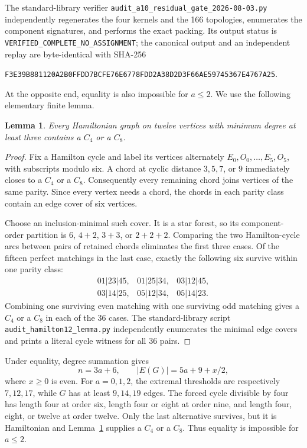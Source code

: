 \documentclass[11pt]{article}
\newtheorem{lemma}[theorem]{Lemma}
\begin{document}
The standard-library verifier
\texttt{audit\_a10\_residual\_gate\_2026-08-03.py} independently regenerates
the four kernels and the 166 topologies, enumerates the component signatures,
and performs the exact packing.  Its output status is
\texttt{VERIFIED\_COMPLETE\_NO\_ASSIGNMENT}; the canonical output and an
independent replay are byte-identical with SHA-256
\begin{center}
\small\texttt{F3E39B881120A2B0FFDD7BCFE76E6778FDD2A38D2D3F66AE59745367E4767A25}.
\end{center}

At the opposite end, equality is also impossible for $a\le2$.  We use the
following elementary finite lemma.

\begin{lemma}\label{lem:hamilton-twelve}
Every Hamiltonian graph on twelve vertices with minimum degree at least
three contains a $C_4$ or a $C_8$.
\end{lemma}

\begin{proof}
Fix a Hamilton cycle and label its vertices alternately
$E_0,O_0,\ldots,E_5,O_5$, with subscripts modulo six.  A chord at cyclic
distance $3,5,7$, or $9$ immediately closes to a $C_4$ or a $C_8$.
Consequently every remaining chord joins vertices of the same parity.  Since
every vertex needs a chord, the chords in each parity class contain an edge
cover of six vertices.

Choose an inclusion-minimal such cover.  It is a star forest, so its
component-order partition is $6$, $4+2$, $3+3$, or $2+2+2$.  Comparing the
two Hamilton-cycle arcs between pairs of retained chords eliminates the
first three cases.  Of the fifteen perfect matchings in the last case,
exactly the following six survive within one parity class:
\[
\begin{array}{lll}
01|23|45,&01|25|34,&03|12|45,\\
03|14|25,&05|12|34,&05|14|23.
\end{array}
\]
Combining one surviving even matching with one surviving odd matching gives
a $C_4$ or a $C_8$ in each of the $36$ cases.  The standard-library script
\texttt{audit\_hamilton12\_lemma.py} independently enumerates the minimal
edge covers and prints a literal cycle witness for all $36$ pairs.
\end{proof}

Under equality, degree summation gives
\[
 n=3a+6,\qquad |E(G)|=5a+9+x/2,
\]
where $x\ge0$ is even.  For $a=0,1,2$, the extremal thresholds are
respectively $7,12,17$, while $G$ has at least $9,14,19$ edges.  The forced
cycle divisible by four has length four at order six, length four or eight
at order nine, and length four, eight, or twelve at order twelve.  Only the
last alternative survives, but it is Hamiltonian and
Lemma~\ref{lem:hamilton-twelve} supplies a $C_4$ or a $C_8$.  Thus equality
is impossible for $a\le2$.
\end{document}

